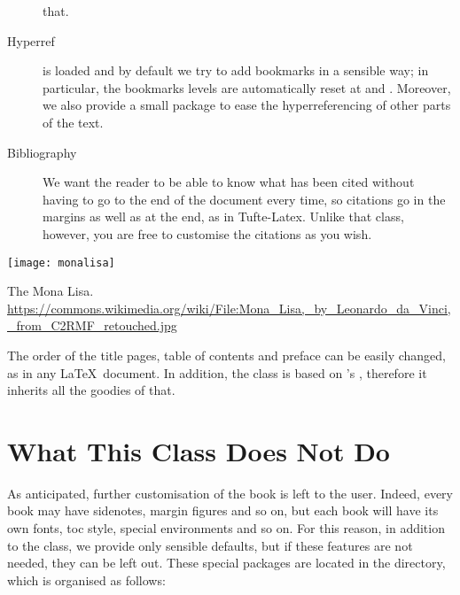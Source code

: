 \begin{description}
	that.
	\item[Hyperref]  is loaded and by default we try
	to add bookmarks in a sensible way; in particular, the bookmarks
	levels are automatically reset at  and
	. Moreover, we also provide a small package to
	ease the hyperreferencing of other parts of the text.
	\item[Bibliography] We want the reader to be able to know what has
	been cited without having to go to the end of the document every
	time, so citations go in the margins as well as at the end, as in
	Tufte-Latex. Unlike that class, however, you are free to customise
	the citations as you wish.
\end{description}

\begin{marginfigure}[-5.5cm]
	\texttt{[image: monalisa]}
	\caption[The Mona Lisa]{The Mona Lisa.\\
	\url{https://commons.wikimedia.org/wiki/File:Mona_Lisa,_by_Leonardo_da_Vinci,_from_C2RMF_retouched.jpg}}
\end{marginfigure}

The order of the title pages, table of contents and preface can be
easily changed, as in any \LaTeX\ document. In addition, the class is
based on \KOMAScript's , therefore it inherits all the
goodies of that.

\section{What This Class Does Not Do}

As anticipated, further customisation of the book is left to the user.
Indeed, every book may have sidenotes, margin figures and so on, but
each book will have its own fonts, toc style, special environments and
so on. For this reason, in addition to the class, we provide only
sensible defaults, but if these features are not needed, they can be
left out. These special packages are located in the 
directory, which is organised as follows:

